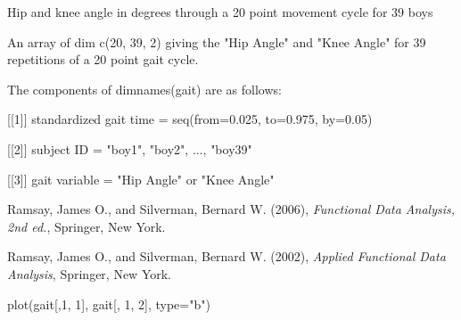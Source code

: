 \begin{Description}\relax
Hip and knee angle in degrees through a 20 point movement cycle for 39
boys
\end{Description}
\begin{Format}\relax
An array of dim c(20, 39, 2) giving the "Hip Angle" and "Knee Angle"
for 39 repetitions of a 20 point gait cycle.
\end{Format}
\begin{Details}\relax
The components of dimnames(gait) are as follows:

[[1]] standardized gait time = seq(from=0.025, to=0.975, by=0.05) 

[[2]] subject ID = "boy1", "boy2", ..., "boy39"  

[[3]] gait variable = "Hip Angle" or "Knee Angle"
\end{Details}
\begin{Source}\relax
Ramsay, James O., and Silverman, Bernard W. (2006), \emph{Functional
Data Analysis, 2nd ed.}, Springer, New York.

Ramsay, James O., and Silverman, Bernard W. (2002), \emph{Applied
Functional Data Analysis}, Springer, New York.
\end{Source}
\begin{Examples}
\begin{ExampleCode}
plot(gait[,1, 1], gait[, 1, 2], type="b")
\end{ExampleCode}
\end{Examples}

